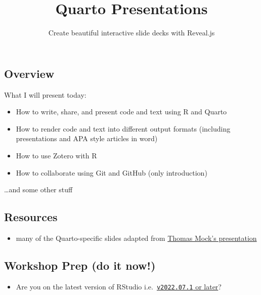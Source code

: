 \documentclass[
  letterpaper,
  DIV=11,
  numbers=noendperiod]{scrartcl}
\title{Quarto Presentations}
\subtitle{Create beautiful interactive slide decks with Reveal.js}
\author{}
\date{}
\providecommand{\tightlist}{%
  \setlength{\itemsep}{0pt}\setlength{\parskip}{0pt}}\usepackage{longtable,booktabs,array}
\begin{document}
\maketitle
\ifdefined\Shaded\renewenvironment{Shaded}{\begin{tcolorbox}[frame hidden, borderline west={3pt}{0pt}{shadecolor}, boxrule=0pt, breakable, interior hidden, sharp corners, enhanced]}{\end{tcolorbox}}\fi

\hypertarget{overview}{%
\subsection{Overview}\label{overview}}

What I will present today:

\begin{itemize}
\tightlist
\item
  How to write, share, and present code and text using R and Quarto
\item
  How to render code and text into different output formats (including
  presentations and APA style articles in word)
\item
  How to use Zotero with R
\item
  How to collaborate using Git and GitHub (only introduction)
\end{itemize}

\ldots and some other stuff

\hypertarget{resources}{%
\subsection{Resources}\label{resources}}

\begin{itemize}
\tightlist
\item
  many of the Quarto-specific slides adapted from
  \href{https://github.com/jthomasmock/quarto-2hr-webinar}{Thomas Mock's
  presentation}
\end{itemize}

\hypertarget{workshop-prep-do-it-now}{%
\subsection{Workshop Prep (do it now!)}\label{workshop-prep-do-it-now}}

\begin{itemize}
\tightlist
\item
  Are you on the latest version of RStudio
  i.e.~\href{https://www.rstudio.com/products/rstudio/download/\#download}{\texttt{v2022.07.1}
  or later}?
\end{itemize}
\end{document}
